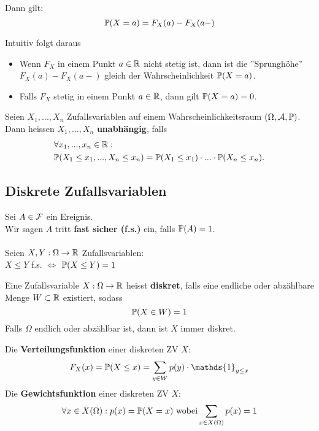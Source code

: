 Dann gilt:
$$\P(X = a) = F_X(a) - F_X(a-)$$

Intuitiv folgt daraus
\begin{itemize}
    \item Wenn $F_X$ in einem Punkt $a \in \R$ nicht stetig ist, dann ist die ''Sprunghöhe'' $F_X(a)-F_X(a-)$ gleich der Wahrscheinlichkeit $\P(X = a)$.
    \item Falls $F_X$ stetig in einem Punkt $a \in \R$, dann gilt $\P(X = a) = 0$. 
\end{itemize}

\begin{mainbox}{}
    Seien $X_1, ...,X_n$ Zufallsvariablen auf einem Wahrscheinlichkeitsraum $(\Omega, \A, \P)$. Dann heissen $X_1, ...,X_n$ \textbf{unabhängig}, falls
    \begin{align*}
        &\forall x_1, ..., x_n \in \R:\\
        &\P(X_1 \leq x_1, ..., X_n \leq x_n) = \P(X_1 \leq x_1)\cdot ... \cdot \P(X_n \leq x_n).
    \end{align*} 
\end{mainbox}


\subsection{Diskrete Zufallsvariablen}
Sei $A \in \F$ ein Ereignis.\\
Wir sagen $A$ tritt \textbf{fast sicher (f.s.)} ein, falls $\P(A)= 1$.
\\ \\
Seien $X, Y: \Omega \to \R$ Zufallsvariablen: \\$X \leq Y$ f.s. $\iff$ $\P(X \leq Y)=1$


\begin{mainbox}{}
    Eine Zufallsvariable $X: \Omega \to \R$ heisst \textbf{diskret}, falls eine endliche oder abzählbare Menge $W \subset \R$ existiert, sodass
    $$\P(X \in W) = 1$$
    Falls $\Omega$ endlich oder abzählbar ist, dann ist $X$ immer diskret.
\end{mainbox}
Die \textbf{Verteilungsfunktion} einer diskreten ZV $X$: $$F_X(x)= \P(X \leq x)= \sum_{y\in W}p(y)\cdot \mathds{1}_{y\leq x}$$
Die \textbf{Gewichtsfunktion} einer diskreten ZV $X$: $$\forall x \in X(\Omega): p(x)= \P(X=x) \text{ wobei} \sum_{x \in X(\Omega)}p(x)= 1$$

